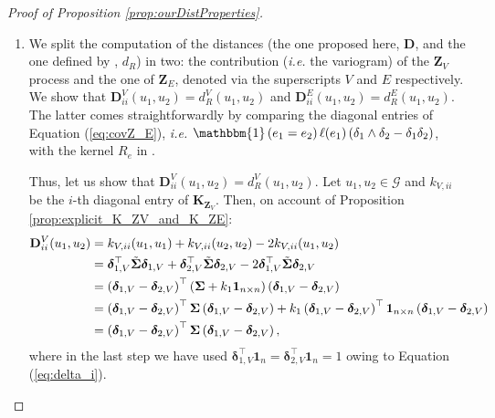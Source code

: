 \documentclass[12pt]{article}
\theoremstyle{plain}
\theoremstyle{remark}
\newcommand{\round}[1]{\left( #1 \right)}
\newcommand{\indOne}[0]{\mathbbm{1}}
\newcommand{\onen}[0]{{\mathbf{1}_{n}}}
\newcommand{\onenn}[0]{{\mathbf{1}_{n\times n}}}
\newcommand{\ie}{\textit{i.e. }}
\newcommand{\dVec}[1]{{\bm{#1}}}            %
\newcommand{\latMatr}[1]{\mathbf{#1}}          %
\newcommand{\grMatr}[1]{{\boldsymbol{#1}}}   %
\newcommand{\rVec}[1]{{\bm{#1}}}            %
\begin{document}
    
    \begin{proof}[Proof of Proposition \ref{prop:ourDistProperties}]
        \begin{enumerate}    
            \item We split the computation of the distances (the one proposed here, ${\latMatr{D}}$, and the one defined by \cite{anderes_isotropic_2020}, $d_{R}$) in two: the contribution (\ie the variogram) of the $\rVec{Z}_V$ process and the one of $\rVec{Z}_E$, denoted via the superscripts $V$ and $E$ respectively. We show that ${\latMatr{D}}_{ii}^V(u_1,u_2)=d_{R}^V(u_1,u_2)$ and ${\latMatr{D}}_{ii}^E(u_1,u_2)=d_{R}^E(u_1,u_2)$. The latter comes straightforwardly by comparing the diagonal entries of Equation (\ref{eq:covZ_E}), \ie $\indOne\round{e_1=e_2}\ell(e_1)\round{\delta_1 \wedge \delta_2 - \delta_1 \delta_2}$, with the kernel $R_e$ in \citet[Equation 15]{anderes_isotropic_2020}. \par
            Thus, let us show that ${\latMatr{D}}_{ii}^V(u_1,u_2)=d_{R}^V(u_1,u_2)$. Let $u_1,u_2\in \mathcal G$ {and $k_{V,ii}$ be the $i$-th diagonal entry of {$\latMatr K_{\rVec{Z}_V}$}. Then, on account of Proposition \ref{prop:explicit_K_ZV_and_K_ZE}}:
            \begin{align*}
                {\latMatr{D}}_{ii}^V(u_1,u_2)&=k_{V,ii}(u_1,u_1)+k_{V,ii}(u_2,u_2)-2k_{V,ii}(u_1,u_2)\\
                &=\dVec{\delta}_{1,V}^\top \Tilde{\grMatr{\Sigma}} \dVec{\delta}_{1,V}+ \dVec{\delta}_{2,V}^\top \Tilde{\grMatr{\Sigma}} \dVec{\delta}_{2,V} -2 \dVec{\delta}_{1,V}^\top \Tilde{\grMatr{\Sigma}} \dVec{\delta}_{2,V}\\
                &=\round{\dVec{\delta}_{1,V}-\dVec{\delta}_{2,V}}^\top \round{{\grMatr{\Sigma}}+k_1 \onenn} \round{\dVec{\delta}_{1,V}-\dVec{\delta}_{2,V}}\\
                &=\round{\dVec{\delta}_{1,V}-\dVec{\delta}_{2,V}}^\top {\grMatr{\Sigma}} \round{\dVec{\delta}_{1,V}-\dVec{\delta}_{2,V}} + k_1\round{\dVec{\delta}_{1,V}-\dVec{\delta}_{2,V}}^\top \onenn \round{\dVec{\delta}_{1,V}-\dVec{\delta}_{2,V}}\\
                &=\round{\dVec{\delta}_{1,V}-\dVec{\delta}_{2,V}}^\top {\grMatr{\Sigma}} \round{\dVec{\delta}_{1,V}-\dVec{\delta}_{2,V}},
            \end{align*}
            where in the last step we have used $\dVec{\delta}_{1,V}^\top \onen = \dVec{\delta}_{2,V}^\top \onen = 1$ owing to Equation (\ref{eq:delta_i}).\par %

\end{enumerate}
\end{proof}
\end{document}
